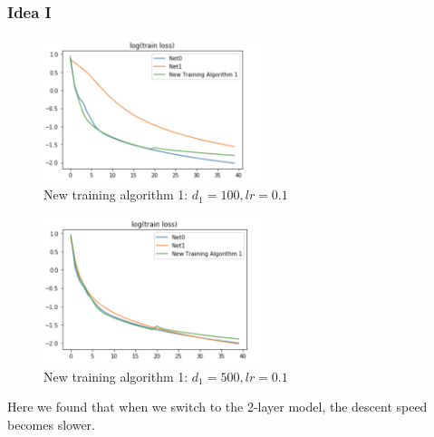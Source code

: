 \subsubsection{Idea I}
\begin{figure}[H]
	\centering
	\includegraphics[width=2.5in]{figure/train1_hidden100.png}
	\caption{New training algorithm 1: $d_1 = 100, lr = 0.1$}
\end{figure}
\begin{figure}[H]
	\centering
	\includegraphics[width=2.5in]{figure/train1_hidden500.png}
	\caption{New training algorithm 1: $d_1 = 500, lr = 0.1$}
\end{figure}
Here we found that when we switch to the 2-layer model, the descent speed becomes slower.

